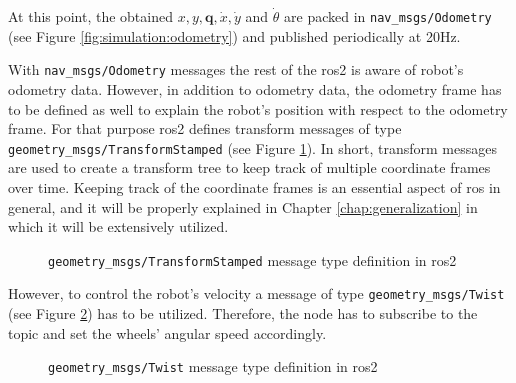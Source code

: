 At this point, the obtained $ x, y, \bm{q}, \dot{x}, \dot{y} $ and $ \dot{\theta} $ are packed in \texttt{nav\_msgs/Odometry} (see Figure \ref{fig:simulation:odometry}) and published periodically at 20Hz.

With \texttt{nav\_msgs/Odometry} messages the rest of the \ac{ros2} is aware of robot's odometry data.
However, in addition to odometry data, the odometry frame has to be defined as well to explain the robot's position with respect to the odometry frame.
For that purpose \ac{ros2} defines transform messages of type \texttt{geometry\_msgs/TransformStamped} (see Figure \ref{fig:simulation:transform}).
In short, transform messages are used to create a transform tree to keep track of multiple coordinate frames over time. 
Keeping track of the coordinate frames is an essential aspect of \ac{ros} in general, and it will be properly explained in Chapter \ref{chap:generalization} in which it will be extensively utilized.

\begin{figure}[H]
    \centering
    \begin{subfigure}[b]{0.9\textwidth}
    \end{subfigure}
    \caption{\texttt{geometry\_msgs/TransformStamped} message type definition in \ac{ros2}}
    \label{fig:simulation:transform}
\end{figure}
However, to control the robot's velocity a message of type \texttt{geometry\_msgs/Twist} (see Figure \ref{fig:simulation:twist}) has to be utilized.
Therefore, the node has to subscribe to the topic and set the wheels' angular speed accordingly.

\begin{figure}[H]
    \centering
    \begin{subfigure}[b]{0.9\textwidth}
    \end{subfigure}
    \caption{\texttt{geometry\_msgs/Twist} message type definition in \ac{ros2}}
    \label{fig:simulation:twist}
\end{figure}

